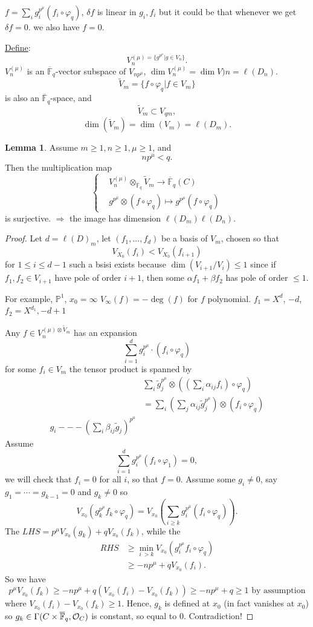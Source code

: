 \documentclass[11pt]{article}
\theoremstyle{definition}
\newtheorem{lemma}[thm]{Lemma}
\newcommand{\proj}{\mathbb P}
\newcommand{\bbf}{\mathbb F}
\newcommand{\calo}{{\cal O}}
\newcommand{\Lrta}{\Longrightarrow}
\newcommand{\lrta}{\longrightarrow}
\begin{document}
$
f=\sum_i g_i^{p^\mu}(f_i\circ \varphi_q)
$, $\delta f$ is linear in $g_i,f_i$ but it could be that  whenever we get $\delta f=0$. we also have $f=0$.

\underline{Define}:
$$
V_n^{(\mu)=\{g^{p^\mu}|g\in V_n\}}.
$$ $V_n^{(\mu)}$ is an $\overline{\bbf}_q$-vector subspace of $V_{n p^\mu}$, $\dim V_n^{(\mu)}=\dim V)n=\ell(D_n)$.
$$
\tilde{V}_m=\{f\circ \varphi_q|f\in V_m\}
$$
is also an $\overline{\bbf}_q$-space, and 
$$
\tilde{V}_m\subset V_{q m},
$$
$$
\dim (\tilde{V}_m)=\dim(V_m)=\ell(D_m).
$$

\begin{lemma}
Assume $m\geq 1, n\geq 1,\mu\geq 1$, and
$$
np^\mu< q.
$$
Then the multiplication map
$$
\left\{
\begin{aligned}
&V_n^{(\mu)}\otimes_{\overline{\bbf}_q}\tilde{V}_m\lrta \overline{\bbf}_q(C)\\
&g^{p^\mu}\otimes(f\circ \varphi_q)\longmapsto g^{p^\mu}(f\circ \varphi_q)
\end{aligned}
\right.
$$
is surjective.
$\Lrta $ the image has dimension $\ell(D_m)\ell(D_n)$.
\end{lemma}
\begin{proof}
Let $d=\ell(D)_m$, let 
$(f_1,...,f_d)$ be a basis of $V_m$, chosen so that 
$$
V_{X_0}(f_i)< V_{X_0}(f_{i+1})
$$
for $1\leq i\leq d-1$ such a bsisi exists because $\dim (V_{i+1}/V_i)\leq 1$ since if $f_1,f_2\in V_{i+1}$ have pole of order $i+1$, then some $\alpha f_1+\beta f_2$ has pole of order $\leq 1$.

For example, $\proj^1$,  $x_0=\infty$ $V_\infty(f)=-\deg(f)$ for $f$ polynomial. $f_1=X^d$, $-d$, $f_2=X^{d_1}, -d+1$


Any $f \in V_n^{(\mu)\otimes \tilde{V}_m}$ has an expansion
$$
\sum_{i=1}^{d}g_i^{p^\mu}\cdot(f_i\circ \varphi_q)
$$
for some $f_i\in V_m$ the tensor product is spanned by 
$$
\begin{aligned}
&\sum_i \tilde{g}_j^{p^\mu}\otimes\left((\sum_i \alpha_{ij}f_i)\circ \varphi_q\right)\\
&= \sum_i (\sum_j \alpha_{ij}\tilde{g}_{j}^{p^\mu})\otimes (f_i\circ \varphi_q)\\
g_i---(\sum_i \beta_{ij}\tilde{g}_j)^{p^\mu}
\end{aligned}
$$
Assume 
$$
\sum_{i=1}^d g_i^{p^\mu}(f_i\circ \varphi_1)=0,
$$
we will check that $f_i=0$ for all $i$, so that $f=0$. Assume
 some $g_i\neq 0$, say $g_1=\cdots=g_{k-1}=0$ and $g_k\neq 0$
  so
  $$
V_{x_0}(g_k^{p^\mu}f_k\circ \varphi_q)
=V_{x_0}\left(\sum_{i\geq k} g_i^{p^\mu}(f_i\circ \varphi_q)\right).  $$
The $LHS=p^\mu V_{x_0}(g_k)+qV_{x_0}(f_k)$, while the
$$
\begin{aligned}
RHS&\geq \min_{i\ >k}V_{x_0}(g_i^{p^\mu}f_i\circ \varphi_q)\\
&\geq -np^\mu+qV_{x_0}(f_i).
\end{aligned}
$$ 
So we have
$$
p^\mu V_{x_0}(f_k)\geq -n p^\mu+ q(V_{x_0}(f_i)-V_{x_0}(f_k))\geq -n p^\mu+q\geq 1\text{ by assumption}
$$
where $V_{x_0}(f_i)-V_{x_0}(f_k)\geq 1$.
Hence, $g_k$ is defined at $x_0$ (in fact vanishes at $x_0$) so $g_k\in \Gamma(C\times \overline{\bbf}_q,\calo_C)$ is constant, so equal to $0$. Contradiction!
\end{proof}
\end{document}
